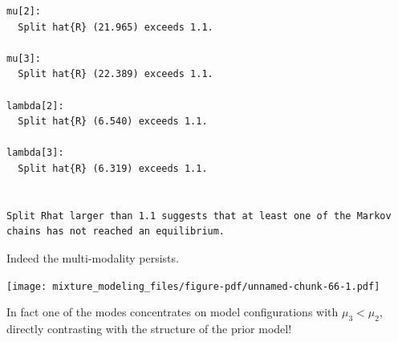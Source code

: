 \documentclass[
  letterpaper,
  DIV=11,
  numbers=noendperiod]{scrartcl}
\newenvironment{Shaded}{\begin{snugshade}}{\end{snugshade}}
\newcommand{\AttributeTok}[1]{\textcolor[rgb]{0.40,0.45,0.13}{#1}}
\newcommand{\ConstantTok}[1]{\textcolor[rgb]{0.56,0.35,0.01}{#1}}
\newcommand{\ControlFlowTok}[1]{\textcolor[rgb]{0.00,0.23,0.31}{#1}}
\newcommand{\DecValTok}[1]{\textcolor[rgb]{0.68,0.00,0.00}{#1}}
\newcommand{\FunctionTok}[1]{\textcolor[rgb]{0.28,0.35,0.67}{#1}}
\newcommand{\NormalTok}[1]{\textcolor[rgb]{0.00,0.23,0.31}{#1}}
\newcommand{\OtherTok}[1]{\textcolor[rgb]{0.00,0.23,0.31}{#1}}
\newcommand{\SpecialCharTok}[1]{\textcolor[rgb]{0.37,0.37,0.37}{#1}}
\newcommand{\StringTok}[1]{\textcolor[rgb]{0.13,0.47,0.30}{#1}}
\begin{document}
\begin{Shaded}
\end{Shaded}

\begin{verbatim}
mu[2]:
  Split hat{R} (21.965) exceeds 1.1.

mu[3]:
  Split hat{R} (22.389) exceeds 1.1.

lambda[2]:
  Split hat{R} (6.540) exceeds 1.1.

lambda[3]:
  Split hat{R} (6.319) exceeds 1.1.


Split Rhat larger than 1.1 suggests that at least one of the Markov
chains has not reached an equilibrium.
\end{verbatim}

Indeed the multi-modality persists.

\begin{Shaded}
\end{Shaded}

\texttt{[image: mixture\_modeling\_files/figure-pdf/unnamed-chunk-66-1.pdf]}

In fact one of the modes concentrates on model configurations with
\(\mu_{3} < \mu_{2}\), directly contrasting with the structure of the
prior model!
\end{document}
